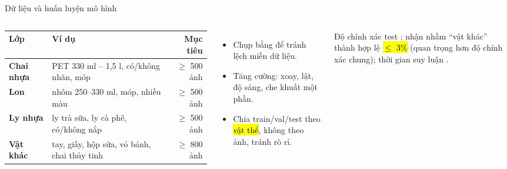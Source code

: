 \documentclass[aspectratio=169,10pt,t]{beamer}
\begin{document}
\begin{frame}{Dữ liệu và huấn luyện mô hình}
\footnotesize
\begin{columns}[T]
\scriptsize
\begin{tabularx}{\linewidth}{@{}>{\bfseries}l X r@{}}
\toprule
\textbf{Lớp} & \textbf{Ví dụ} & \textbf{Mục tiêu}\\\midrule
Chai nhựa & PET 330 ml -- 1,5 l, có/không nhãn, móp & $\ge$ 500 ảnh\\
Lon & nhôm 250--330 ml, móp, nhiều màu & $\ge$ 500 ảnh\\
Ly nhựa & ly trà sữa, ly cà phê, có/không nắp & $\ge$ 500 ảnh\\
Vật khác & tay, giấy, hộp sữa, vỏ bánh, chai thủy tinh & $\ge$ 800 ảnh\\
\bottomrule
\end{tabularx}\vskip3pt
\begin{itemize}\setlength\itemsep{1pt}
  \item Chụp bằng  để tránh lệch miền dữ liệu.
  \item Tăng cường: xoay, lật, độ sáng, che khuất một phần.
  \item Chia train/val/test theo \hl{vật thể}, không theo ảnh, tránh rò rỉ.
\end{itemize}
\centering
{}\par\vskip4pt
\raggedright
{}
\scriptsize
Độ chính xác test ; nhận nhầm ``vật khác'' thành hợp lệ \hl{$\le$ 3\%} (quan trọng hơn độ chính xác chung); thời gian suy luận .
\end{columns}
\end{frame}
\end{document}
